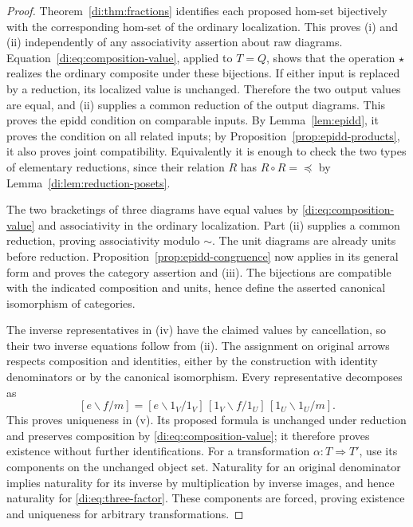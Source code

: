 \documentclass[11pt,reqno,a4paper]{amsart}
\theoremstyle{definition}
\theoremstyle{remark}
\newcommand{\0}{\mathbf{0}}
\renewcommand{\1}{\mathbf{1}}
\begin{document}
\begin{proof}
Theorem~\ref{di:thm:fractions} identifies each proposed hom-set
bijectively with the corresponding hom-set of the ordinary
localization. This proves (i) and (ii) independently of any
associativity assertion about raw diagrams.
Equation~\eqref{di:eq:composition-value}, applied to $T=Q$, shows
that the operation $\star$ realizes the ordinary composite under
these bijections. If either input is replaced by a reduction, its
localized value is unchanged. Therefore the two output values are
equal, and (ii) supplies a common reduction of the output diagrams.
This proves the epidd condition on comparable inputs. By
Lemma~\ref{lem:epidd}, it proves the condition on all related inputs;
by Proposition~\ref{prop:epidd-products}, it also proves joint
compatibility. Equivalently it is enough to check the two types of
elementary reductions, since their relation $R$ has
$R\circ R=\preceq$ by Lemma~\ref{di:lem:reduction-posets}.

The two bracketings of three diagrams have equal values by
\eqref{di:eq:composition-value} and associativity in the ordinary
localization. Part (ii) supplies a common reduction, proving
associativity modulo $\sim$. The unit diagrams are already units
before reduction. Proposition~\ref{prop:epidd-congruence} now applies
in its general form and proves the category assertion and (iii).
The bijections are compatible with the indicated composition and
units, hence define the asserted canonical isomorphism of categories.

The inverse representatives in (iv) have the claimed values by
cancellation, so their two inverse equations follow from (ii).
The assignment on original arrows respects composition and
identities, either by the construction with identity denominators
or by the canonical isomorphism. Every representative decomposes as
\begin{equation}\label{di:eq:three-factor}
 [e\backslash f/m]
 = [e\backslash1_V/1_V]\,
   [1_V\backslash f/1_U]\,
   [1_U\backslash1_U/m].
\end{equation}
This proves uniqueness in (v). Its proposed formula is unchanged
under reduction and preserves composition by
\eqref{di:eq:composition-value}; it therefore proves existence
without further identifications. For a transformation $\alpha:T\Rightarrow T'$,
use its components on the unchanged object set. Naturality for an
original denominator implies naturality for its inverse by
multiplication by inverse images, and hence naturality for
\eqref{di:eq:three-factor}. These components are forced, proving
existence and uniqueness for arbitrary transformations.
\end{proof}
\end{document}
